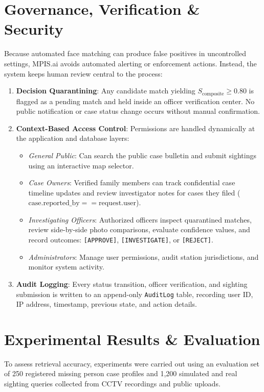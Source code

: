 \documentclass[conference]{IEEEtran}
\begin{document}
\section{Governance, Verification \& Security}
Because automated face matching can produce false positives in uncontrolled settings, MPIS.ai avoids automated alerting or enforcement actions. Instead, the system keeps human review central to the process:
\begin{enumerate}
    \item \textbf{Decision Quarantining}: Any candidate match yielding $S_{\text{composite}} \ge 0.80$ is flagged as a pending match and held inside an officer verification center. No public notification or case status change occurs without manual confirmation.
    \item \textbf{Context-Based Access Control}: Permissions are handled dynamically at the application and database layers:
    \begin{itemize}
        \item \textit{General Public}: Can search the public case bulletin and submit sightings using an interactive map selector.
        \item \textit{Case Owners}: Verified family members can track confidential case timeline updates and review investigator notes for cases they filed ($\text{case.reported\_by} == \text{request.user}$).
        \item \textit{Investigating Officers}: Authorized officers inspect quarantined matches, review side-by-side photo comparisons, evaluate confidence values, and record outcomes: \texttt{[APPROVE]}, \texttt{[INVESTIGATE]}, or \texttt{[REJECT]}.
        \item \textit{Administrators}: Manage user permissions, audit station jurisdictions, and monitor system activity.
    \end{itemize}
    \item \textbf{Audit Logging}: Every status transition, officer verification, and sighting submission is written to an append-only \texttt{AuditLog} table, recording user ID, IP address, timestamp, previous state, and action details.
\end{enumerate}

\section{Experimental Results \& Evaluation}
To assess retrieval accuracy, experiments were carried out using an evaluation set of 250 registered missing person case profiles and 1,200 simulated and real sighting queries collected from CCTV recordings and public uploads.
\end{document}
